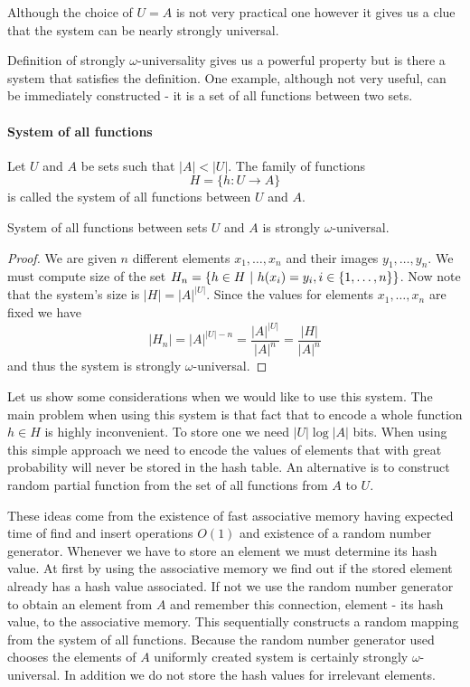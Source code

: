 Although the choice of $U = A$ is not very practical one however it gives us a clue that the system can be nearly strongly universal.

Definition of strongly $\omega$-universality gives us a powerful property but is there a system that satisfies the definition. One example, although not very useful, can be immediately constructed - it is a set of all functions between two sets.

\paragraph{System of all functions}
\begin{definition}
Let $U$ and $A$ be sets such that $|A| < |U|$. The family of functions
\[
H = \{h: U \rightarrow A \}
\]
is called the system of all functions between $U$ and $A$.
\end{definition}

\begin{remark}
System of all functions between sets $U$ and $A$ is strongly $\omega$-universal.
\end{remark}
\begin{proof}
We are given $n$ different elements $x_1, \dots, x_n$ and their images $y_1, \dots, y_n$. We must compute size of the set $H_n = \lbrace h \in H \ | \  h(x_i) = y_i, i \in \lbrace 1, \dots, n\rbrace \rbrace$. Now note that the system's size is $|H| = {|A|}^{|U|}$. Since the values for elements $x_1, \dots, x_n$ are fixed we have \[ |H_n| = {|A|}^{|U| - n} = \frac{{|A|}^{|U|}}{{|A|}^{n}} = \frac{|H|}{|A|^n} \] and thus the system is strongly $\omega$-universal.
\end{proof}

Let us show some considerations when we would like to use this system. The main problem when using this system is that fact that to encode a whole function $h \in H$ is highly inconvenient. To store one we need $|U| \log |A|$ bits. When using this simple approach we need to encode the values of elements that with great probability will never be stored in the hash table. An alternative is to construct random partial function from the set of all functions from $A$ to $U$. 

These ideas come from the existence of fast associative memory having expected time of find and insert operations $O(1)$ and existence of a random number generator. Whenever we have to store an element we must determine its hash value. At first by using the associative memory we find out if the stored element already has a hash value associated. If not we use the random number generator to obtain an element from $A$ and remember this connection, element - its hash value, to the associative memory. This sequentially constructs a random mapping from the system of all functions. Because the random number generator used chooses the elements of $A$ uniformly created system is certainly strongly $\omega$-universal. In addition we do not store the hash values for irrelevant elements. 

